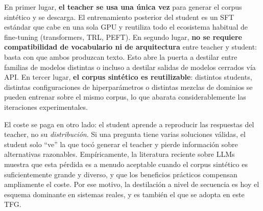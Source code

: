 \documentclass[11pt,a4paper]{article}
\begin{document}
En primer lugar, \textbf{el teacher se usa una única vez} para generar el corpus sintético y se descarga. El entrenamiento posterior del student es un SFT estándar que cabe en una sola GPU y reutiliza todo el ecosistema habitual de fine-tuning (transformers, TRL, PEFT). En segundo lugar, \textbf{no se requiere compatibilidad de vocabulario ni de arquitectura} entre teacher y student: basta con que ambos produzcan texto. Esto abre la puerta a destilar entre familias de modelos distintas o incluso a destilar salidas de modelos cerrados vía API. En tercer lugar, \textbf{el corpus sintético es reutilizable}: distintos students, distintas configuraciones de hiperparámetros o distintas mezclas de dominios se pueden entrenar sobre el mismo corpus, lo que abarata considerablemente las iteraciones experimentales.

El coste se paga en otro lado: el student aprende a reproducir las respuestas del teacher, no su \emph{distribución}. Si una pregunta tiene varias soluciones válidas, el student solo ``ve'' la que tocó generar el teacher y pierde información sobre alternativas razonables. Empíricamente, la literatura reciente sobre LLMs muestra que esta pérdida es a menudo aceptable cuando el corpus sintético es suficientemente grande y diverso, y que los beneficios prácticos compensan ampliamente el coste. Por ese motivo, la destilación a nivel de secuencia es hoy el esquema dominante en sistemas reales, y es también el que se adopta en este TFG.
\end{document}
